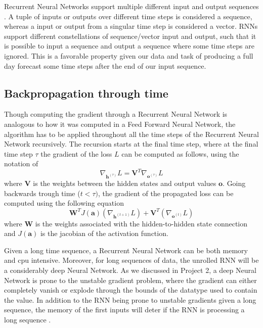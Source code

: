 \documentclass
[twocolumn,
secnumarabic,
nobibnotes,
aps,
prl,
reprint,
groupedaddress,
amsmath,
amssymb,
]{revtex4-2}
\begin{document}
Recurrent Neural Networks support multiple different input and output sequences \cite{Geron2019}. A tuple of inputs or outputs over different time steps is considered a sequence, whereas a input or output from a singular time step is considered a vector. RNNs support different constellations of sequence/vector input and output, such that it is possible to input a sequence and output a sequence where some time steps are ignored. This is a favorable property given our data and task of producing a full day forecast some time steps after the end of our input sequence.

\subsection{Backpropagation through time}
Though computing the gradient through a Recurrent Neural Network is analogous to how it was computed in a Feed Forward Neural Network, the algorithm has to be applied throughout all the time steps of the Recurrent Neural Network recursively. The recursion starts at the final time step, where at the final time step $\tau$ the gradient of the loss $L$ can be computed as follows, using the notation of \cite{Goodfellow2016}
\begin{equation}
  \nabla_{\bm{h}^{(\tau)}}L = \bm{V}^T \nabla_{\bm{o}^{(\tau)}}L
\end{equation}
where $\bm{V}$ is the weights between the hidden states and output values $\bm{o}$.
Going backwards trough time ($t < \tau)$, the gradient of the propagated loss can be computed using the following equation
\begin{equation}
  \bm{W}^TJ(\bm{a})(\nabla_{\bm{h}^{(t+1)}}L)+\bm{V}^T(\nabla_{\bm{o}^{(t)}}L)
\end{equation}
where $\bm{W}$ is the weights associated with the hidden-to-hidden state connection and $J(\bm{a})$ is the jacobian of the activation function.%

Given a long time sequence, a Recurrent Neural Network can be both memory and cpu intensive. Moreover, for long sequences of data, the unrolled RNN will be a considerably deep Neural Network. As we discussed in Project 2, a deep Neural Network is prone to the unstable gradient problem, where the gradient can either completely vanish or explode through the bounds of the datatype used to contain the value. In addition to the RNN being prone to unstable gradients given a long sequence, the memory of the first inputs will deter if the RNN is processing a long sequence \cite{Geron2019}.
\end{document}
